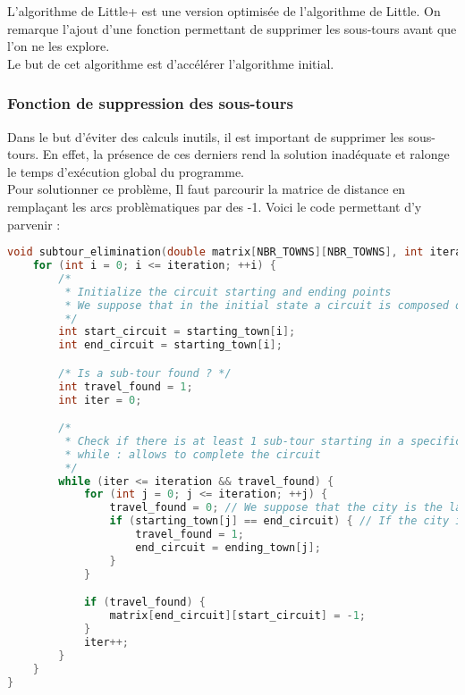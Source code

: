 \documentclass[a4paper]{article}
\begin{document}
L'algorithme de Little+ est une version optimisée de l'algorithme de Little. On remarque l'ajout d'une fonction permettant de supprimer les sous-tours avant que l'on ne les explore.\\
Le but de cet algorithme est d'accélérer l'algorithme initial.

\subsubsection{Fonction de suppression des sous-tours}

Dans le but d'éviter des calculs inutils, il est important de supprimer les sous-tours. En effet, la présence de ces derniers rend la solution inadéquate et ralonge le temps d'exécution global du programme.\\
Pour solutionner ce problème, Il faut parcourir la matrice de distance en remplaçant les arcs problèmatiques par des -1. Voici le code permettant d'y parvenir : 

\begin{lstlisting}[language=C]
    void subtour_elimination(double matrix[NBR_TOWNS][NBR_TOWNS], int iteration) {
    for (int i = 0; i <= iteration; ++i) {
        /*
         * Initialize the circuit starting and ending points
         * We suppose that in the initial state a circuit is composed of a single city
         */
        int start_circuit = starting_town[i];
        int end_circuit = starting_town[i];

        /* Is a sub-tour found ? */
        int travel_found = 1;
        int iter = 0;

        /*
         * Check if there is at least 1 sub-tour starting in a specific city
         * while : allows to complete the circuit
         */
        while (iter <= iteration && travel_found) {
            for (int j = 0; j <= iteration; ++j) {
                travel_found = 0; // We suppose that the city is the last one of the circuit
                if (starting_town[j] == end_circuit) { // If the city is in the middle of the circuit
                    travel_found = 1;
                    end_circuit = ending_town[j];
                }
            }

            if (travel_found) {
                matrix[end_circuit][start_circuit] = -1;
            }
            iter++;
        }
    }
}
\end{lstlisting}
\end{document}
